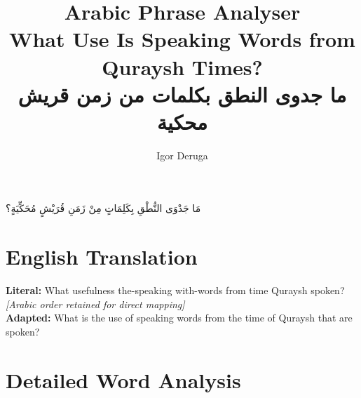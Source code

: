 \documentclass[letterpaper,12pt]{article}
\begin{document}
\title{\textbf{\Large Arabic Phrase Analyser}\\
\large What Use Is Speaking Words from Quraysh Times?\\
\normalsize \textarabic{ما جدوى النطق بكلمات من زمن قريش محكية}}
\author{Igor Deruga}
\date{}
\maketitle

\begin{tcolorbox}[colback=boxcolor,colframe=headercolor,title=\textbf{Arabic Phrase with Full Diacritics},breakable]
\centering
\Large\textarabic{مَا جَدْوَى النُّطْقِ بِكَلِمَاتٍ مِنْ زَمَنِ قُرَيْشٍ مُحَكِّيَةٍ؟}
\end{tcolorbox}

\section{English Translation}
\begin{tcolorbox}[colback=white,colframe=accentcolor,breakable]
\textbf{Literal:} What usefulness the-speaking with-words from time Quraysh spoken?\\
\textit{[Arabic order retained for direct mapping]}\\[0.5em]
\textbf{Adapted:} What is the use of speaking words from the time of Quraysh that are spoken?
\end{tcolorbox}

\section{Detailed Word Analysis}
\end{document}
